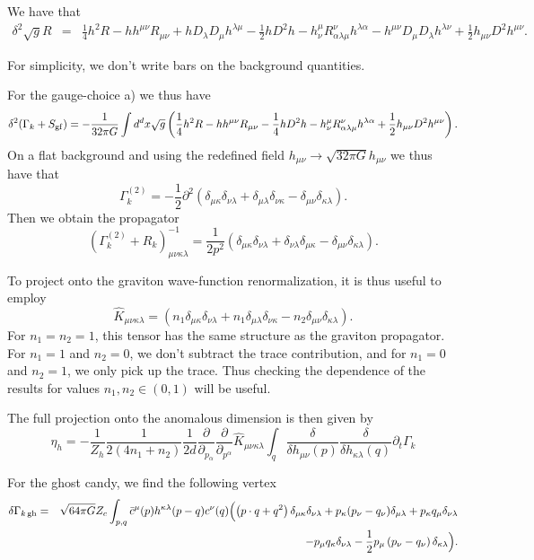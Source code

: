 \documentclass[11pt]{book} %
\newcommand{\be}{\begin{equation}}
\newcommand{\ee}{\end{equation}}
\newcommand{\bea}{\begin{eqnarray}}
\newcommand{\eea}{\end{eqnarray}}
\numberwithin{equation}{chapter}
\begin{document}
{\begin{appendices}
We have that
\bea
\delta^2 \sqrt{g}R &=& \frac{1}{4}h^2 R - h h^{\mu \nu}R_{\mu \nu} + hD_{\lambda}D_{\mu}h^{\lambda \mu} - \frac{1}{2}h D^2 h - h^{\mu}_{\nu}R^{\nu}_{\alpha \lambda \mu}h^{\lambda \alpha} - h^{\mu \nu}D_{\mu}D_{\lambda}h^{\lambda\nu}+ \frac{1}{2}h_{\mu \nu}D^2 h^{\mu \nu}.
\eea

For simplicity, we don't write bars on the background quantities.

For the gauge-choice a) we thus have
\be
\delta^2(\Gamma_k+S_{\rm gf})= -\frac{1}{32 \pi G} \int d^dx \sqrt{g}\left(\frac{1}{4}h^2 R - h h^{\mu \nu}R_{\mu \nu} - \frac{1}{4}h D^2 h  - h^{\mu}_{\nu}R^{\nu}_{\alpha \lambda \mu}h^{\lambda \alpha}+ \frac{1}{2}h_{\mu \nu}D^2 h^{\mu \nu}\right).
\ee
On a flat background and using the redefined field $h_{\mu \nu} \rightarrow \sqrt{32 \pi G} h_{\mu \nu}$ we thus have that
\be
\Gamma_k^{(2)} = - \frac{1}{2}\partial^2 \left(\delta_{\mu \kappa}\delta_{\nu \lambda} + \delta_{\mu \lambda} \delta_{\nu \kappa} - \delta_{\mu \nu} \delta_{\kappa \lambda} \right).
\ee
Then we obtain the propagator
\be
(\Gamma_k^{(2)}+R_k)^{-1}_{\mu \nu \kappa \lambda} = \frac{1}{2 p^2}(\delta_{\mu \kappa} \delta_{\nu \lambda}+ \delta_{\nu\lambda}\delta_{\mu\kappa} - \delta_{\mu \nu}\delta_{\kappa \lambda}).
\ee

To project onto the graviton wave-function renormalization, it is thus useful to employ
\be
\hat{K}_{\mu \nu\kappa \lambda}= \left(n_1 \delta_{\mu \kappa}\delta_{\nu \lambda} + n_1 \delta_{\mu \lambda} \delta_{\nu \kappa} -n_2 \delta_{\mu \nu} \delta_{\kappa \lambda} \right).\label{extproj}
\ee
For $n_1=n_2=1$, this tensor has the same structure as the graviton propagator. For $n_1=1$ and $n_2=0$, we don't subtract the trace contribution, and for $n_1=0$ and $n_2=1$, we only pick up the trace. Thus checking the dependence of the results for values $n_1, n_2 \in (0,1)$ will be useful.

The full projection onto the anomalous dimension is then given by
\be
\eta_h = - \frac{1}{Z_h} \frac{1}{2(4n_1+n_2)} \frac{1}{2 d} \frac{\partial}{\partial_{p_{\alpha}}} \frac{\partial}{\partial_{p^{\alpha}}} \hat{K}_{\mu \nu\kappa\lambda} \int_q \frac{\delta}{\delta h_{\mu \nu}(p)}\frac{\delta}{\delta h_{\kappa \lambda}(q)} \partial_t \Gamma_k
\ee

For the ghost candy, we find the following vertex
\bea
\delta \Gamma_{k\, \rm gh}&=& \sqrt{64 \pi G} Z_c \int_{p,q} \bar{c}^{\mu} (p)h^{\kappa \lambda}(p-q)c^{\nu}(q) \Bigl(\left(p\cdot q+q^2\right) \delta_{\mu \kappa} \delta_{\nu\lambda} +p_{\kappa}(p_{\nu}-q_{\nu})\delta_{\mu \lambda} + p_{\kappa}q_{\mu}\delta_{\nu \lambda}\nonumber\\
&{}& - p_{\mu}q_{\kappa}\delta_{\nu \lambda} - \frac{1}{2} p_{\mu}\left(p_{\nu}-q_{\nu}\right)\delta_{\kappa \lambda}\Bigr).
\eea


\end{appendices}}
\end{document}
